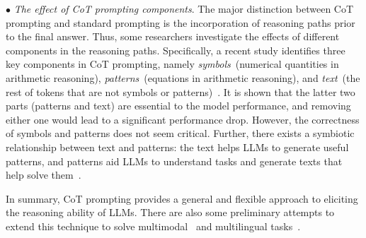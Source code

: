 $\bullet$ \emph{The effect of CoT prompting components}. 
The major distinction between CoT prompting and standard prompting is the incorporation of reasoning paths prior to the final answer. 
Thus, some researchers investigate the effects of different components in the reasoning paths. 
Specifically, a recent study identifies three key components in CoT prompting, namely  \emph{symbols}~(\eg numerical quantities in arithmetic reasoning), \emph{patterns}~(\eg equations in arithmetic reasoning), and \emph{text}~(\ie the rest of tokens that are not symbols or patterns)~\cite{Madaan-arxiv-2022-Text}. 
It is shown that the latter two parts (\ie patterns and text) are essential to the model performance, and removing either one would lead to a significant performance drop. 
However, the correctness of symbols and patterns does not seem critical. 
Further, there exists a symbiotic relationship between text and patterns:   the text helps LLMs to generate useful patterns, and patterns aid LLMs to understand tasks and generate texts that help solve them~\cite{Madaan-arxiv-2022-Text}.


In summary, CoT prompting provides a general and flexible approach to eliciting the reasoning ability of LLMs. 
There are also some preliminary attempts to extend this technique to solve multimodal~\cite{Zhang-arxiv-2022-Multimodal} and multilingual tasks~\cite{Shi-arxiv-2022-Language}.